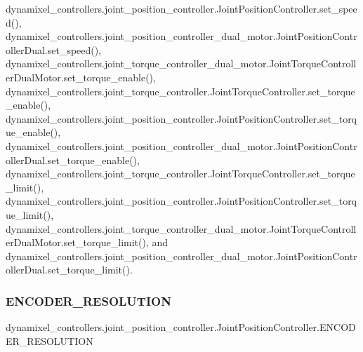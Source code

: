 dynamixel\+\_\+controllers.\+joint\+\_\+position\+\_\+controller.\+Joint\+Position\+Controller.\+set\+\_\+speed(), dynamixel\+\_\+controllers.\+joint\+\_\+position\+\_\+controller\+\_\+dual\+\_\+motor.\+Joint\+Position\+Controller\+Dual.\+set\+\_\+speed(), dynamixel\+\_\+controllers.\+joint\+\_\+torque\+\_\+controller\+\_\+dual\+\_\+motor.\+Joint\+Torque\+Controller\+Dual\+Motor.\+set\+\_\+torque\+\_\+enable(), dynamixel\+\_\+controllers.\+joint\+\_\+torque\+\_\+controller.\+Joint\+Torque\+Controller.\+set\+\_\+torque\+\_\+enable(), dynamixel\+\_\+controllers.\+joint\+\_\+position\+\_\+controller.\+Joint\+Position\+Controller.\+set\+\_\+torque\+\_\+enable(), dynamixel\+\_\+controllers.\+joint\+\_\+position\+\_\+controller\+\_\+dual\+\_\+motor.\+Joint\+Position\+Controller\+Dual.\+set\+\_\+torque\+\_\+enable(), dynamixel\+\_\+controllers.\+joint\+\_\+torque\+\_\+controller.\+Joint\+Torque\+Controller.\+set\+\_\+torque\+\_\+limit(), dynamixel\+\_\+controllers.\+joint\+\_\+position\+\_\+controller.\+Joint\+Position\+Controller.\+set\+\_\+torque\+\_\+limit(), dynamixel\+\_\+controllers.\+joint\+\_\+torque\+\_\+controller\+\_\+dual\+\_\+motor.\+Joint\+Torque\+Controller\+Dual\+Motor.\+set\+\_\+torque\+\_\+limit(), and dynamixel\+\_\+controllers.\+joint\+\_\+position\+\_\+controller\+\_\+dual\+\_\+motor.\+Joint\+Position\+Controller\+Dual.\+set\+\_\+torque\+\_\+limit().

\mbox{\label{classdynamixel__controllers_1_1joint__position__controller_1_1_joint_position_controller_a52f2e68973b8ed8ac2b77802932362a7}} 
\subsubsection{\texorpdfstring{E\+N\+C\+O\+D\+E\+R\+\_\+\+R\+E\+S\+O\+L\+U\+T\+I\+ON}{ENCODER\_RESOLUTION}}
{\footnotesize\ttfamily dynamixel\+\_\+controllers.\+joint\+\_\+position\+\_\+controller.\+Joint\+Position\+Controller.\+E\+N\+C\+O\+D\+E\+R\+\_\+\+R\+E\+S\+O\+L\+U\+T\+I\+ON}



